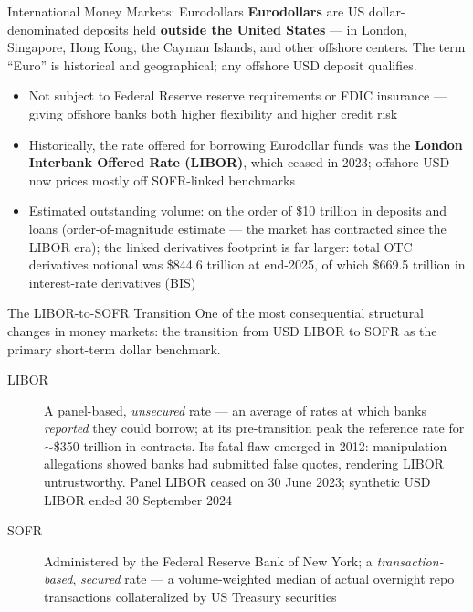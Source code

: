\documentclass[aspectratio=169]{beamer}
\begin{document}

\begin{frame}{International Money Markets: Eurodollars}
\textbf{Eurodollars} are US dollar-denominated deposits held \textbf{outside the United States} --- in London, Singapore, Hong Kong, the Cayman Islands, and other offshore centers. The term ``Euro'' is historical and geographical; any offshore USD deposit qualifies.
\begin{itemize}
  \item Not subject to Federal Reserve reserve requirements or FDIC insurance --- giving offshore banks both higher flexibility and higher credit risk
  \item Historically, the rate offered for borrowing Eurodollar funds was the \textbf{London Interbank Offered Rate (LIBOR)}, which ceased in 2023; offshore USD now prices mostly off SOFR-linked benchmarks
  \item Estimated outstanding volume: on the order of \$10 trillion in deposits and loans (order-of-magnitude estimate --- the market has contracted since the LIBOR era); the linked derivatives footprint is far larger: total OTC derivatives notional was \$844.6 trillion at end-2025, of which \$669.5 trillion in interest-rate derivatives (BIS)
\end{itemize}
\end{frame}

\begin{frame}{The LIBOR-to-SOFR Transition}
One of the most consequential structural changes in money markets: the transition from USD LIBOR to SOFR as the primary short-term dollar benchmark.
\begin{description}
  \item[LIBOR] A panel-based, \emph{unsecured} rate --- an average of rates at which banks \emph{reported} they could borrow; at its pre-transition peak the reference rate for $\sim$\$350 trillion in contracts. Its fatal flaw emerged in 2012: manipulation allegations showed banks had submitted false quotes, rendering LIBOR untrustworthy. Panel LIBOR ceased on 30 June 2023; synthetic USD LIBOR ended 30 September 2024
  \item[SOFR] Administered by the Federal Reserve Bank of New York; a \emph{transaction-based}, \emph{secured} rate --- a volume-weighted median of actual overnight repo transactions collateralized by US Treasury securities
\end{description}
\end{frame}
\end{document}
